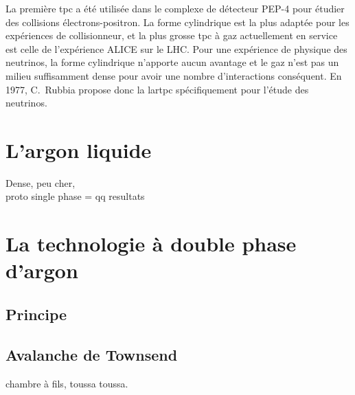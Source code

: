     La première \gls{tpc} a été utilisée dans le complexe de détecteur PEP-4 pour étudier des collisions électrons-positron. La forme cylindrique est la plus adaptée pour les expériences de collisionneur, et la plus grosse \gls{tpc} à gaz actuellement en service est celle de l'expérience ALICE sur le LHC. Pour une expérience de physique des neutrinos, la forme cylindrique n'apporte aucun avantage et le gaz n'est pas un milieu suffisamment dense pour avoir une nombre d'interactions conséquent. En 1977, C.~Rubbia propose donc la \acrfull{lartpc} \cite{Rubbia1977} spécifiquement pour l'étude des neutrinos.
    
  \section{L'argon liquide}\label{sec::lartpc}
      Dense, peu cher, \\
      proto single phase = qq resultats
    
  \section{La technologie à double phase d'argon}
    \subsection{Principe}
    \subsection{Avalanche de Townsend}
      chambre à fils, toussa toussa.
